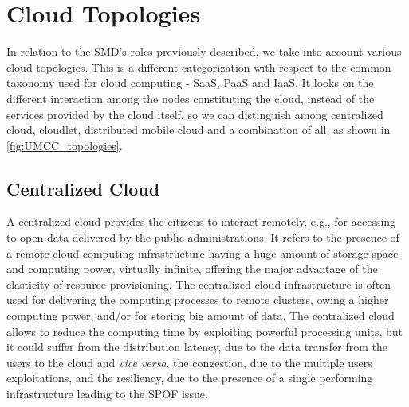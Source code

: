 \documentclass[twoside,openright]{report}
\begin{document}
\section{Cloud Topologies}
\label{sec:CloudTopologies}
In relation to the \gls{SMD}'s roles previously described, we take into account various cloud topologies. This is a different categorization with respect to the common taxonomy used for cloud computing - \gls{SaaS}, \gls{PaaS} and \gls{IaaS}. It looks on the different interaction among the  nodes constituting the cloud, instead of the services provided by the cloud itself, so we can distinguish among centralized cloud, cloudlet, distributed mobile cloud and a combination of all, as shown in \autoref{fig:UMCC_topologies}. 
\subsection*{Centralized Cloud} 
A centralized cloud provides the citizens to interact remotely, e.g., for accessing to open data delivered by the public administrations. 
It refers to the presence of a remote cloud computing infrastructure having a huge amount of storage space and computing power, virtually infinite, offering the major advantage of the elasticity of resource provisioning. 
The centralized cloud infrastructure is often used for delivering the computing processes to remote clusters, owing a higher computing power, and/or for storing big amount of data. 
The centralized cloud allows to reduce the computing time by exploiting powerful processing units, but it could suffer from the distribution latency, due to the data transfer from the users to the cloud and \textit{vice versa}, the congestion, due to the multiple users exploitations, and the resiliency, due to the presence of a single performing infrastructure leading to the \gls{SPOF} issue.
\end{document}
